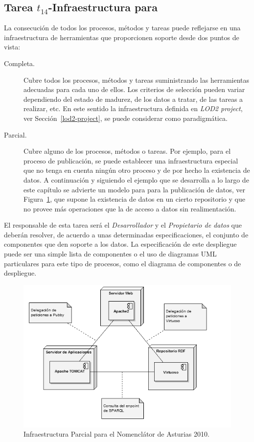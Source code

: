 \newpage

\subsection{Tarea $t_{14}$-Infraestructura para \linkeddata}
La consecución de todos los procesos, métodos y tareas puede reflejarse en una infraestructura
de herramientas que proporcionen soporte desde dos puntos de vista:

\begin{description}
 \item [Completa.] Cubre todos los procesos, métodos y tareas suministrando las herramientas
adecuadas para cada uno de ellos. Los criterios de selección pueden variar dependiendo
del estado de madurez, de los datos a tratar, de las tareas a realizar, etc. En este sentido
la infraestructura definida en \textit{LOD2 project}, ver Sección~\ref{lod2-project}, se puede
considerar como paradigmática.
\item [Parcial.] Cubre alguno de los procesos, métodos o tareas. Por ejemplo, para el proceso
de publicación, se puede establecer una infraestructura especial que no tenga en cuenta ningún
otro proceso y de por hecho la existencia de datos. A continuación y siguiendo el ejemplo que se desarrolla a lo largo de este capítulo se advierte 
un modelo para para la publicación de datos, ver Figura~\ref{fig:deploy-nomenclator}, que 
supone la existencia de datos en un cierto repositorio y que no provee más operaciones
que la de acceso a datos sin realimentación.
\end{description}

El responsable de esta tarea será el \textit{Desarrollador} y el \textit{Propietario de datos} que deberán
resolver, de acuerdo a unas determinadas especificaciones, el conjunto de componentes que den soporte a los datos. La especificación
de este despliegue puede ser una simple lista de componentes o el uso de diagramas UML particulares
para este tipo de procesos, como el diagrama de componentes o de despliegue.

\begin{figure}[!htb]
\centering
	\includegraphics[width=12cm]{images/phd/infra-ld}
\caption{Infraestructura Parcial para el Nomenclátor de Asturias 2010.}
\label{fig:deploy-nomenclator}
\end{figure}

